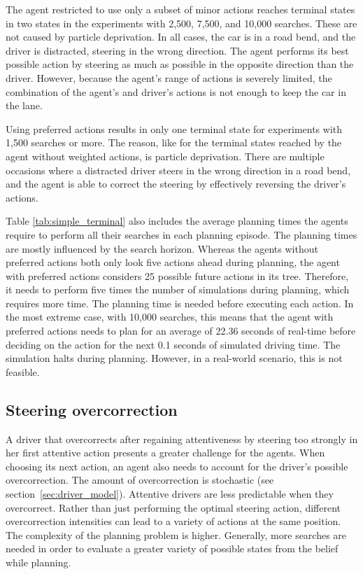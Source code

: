 The agent restricted to use only a subset of minor actions reaches terminal states in two states in the experiments with 2,500, 7,500, and 10,000 searches. These are not caused by particle deprivation. In all cases, the car is in a road bend, and the driver is distracted, steering in the wrong direction. The agent performs its best possible action by steering as much as possible in the opposite direction than the driver. However, because the agent's range of actions is severely limited, the combination of the agent's and driver's actions is not enough to keep the car in the lane. 

Using preferred actions results in only one terminal state for experiments with 1,500 searches or more. The reason, like for the terminal states reached by the agent without weighted actions, is particle deprivation. There are multiple occasions where a distracted driver steers in the wrong direction in a road bend, and the agent is able to correct the steering by effectively reversing the driver's actions.



Table \ref{tab:simple_terminal} also includes the average planning times the agents require to perform all their searches in each planning episode. The planning times are mostly influenced by the search horizon. Whereas the agents without preferred actions both only look five actions ahead during planning, the agent with preferred actions considers 25 possible future actions in its tree. Therefore, it needs to perform five times the number of simulations during planning, which requires more time. The planning time is needed before executing each action. In the most extreme case, with 10,000 searches, this means that the agent with preferred actions needs to plan for an average of 22.36 seconds of real-time before deciding on the action for the next 0.1 seconds of simulated driving time. The simulation halts during planning. However, in a real-world scenario, this is not feasible.

\subsection{Steering overcorrection}

A driver that overcorrects after regaining attentiveness by steering too strongly in her first attentive action presents a greater challenge for the agents. When choosing its next action, an agent also needs to account for the driver's possible overcorrection. The amount of overcorrection is stochastic (see section~\ref{sec:driver_model}). Attentive drivers are less predictable when they overcorrect. Rather than just performing the optimal steering action, different overcorrection intensities can lead to a variety of actions at the same position. The complexity of the planning problem is higher. Generally, more searches are needed in order to evaluate a greater variety of possible states from the belief while planning.

